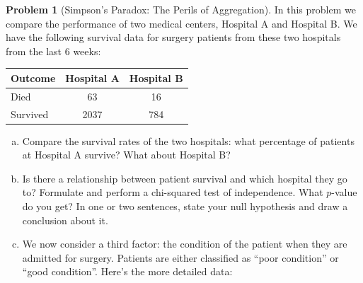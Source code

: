 \documentclass[10pt]{amsart}
\theoremstyle{definition}
\newtheorem{problem}[theorem]{Problem}
\newcommand{\1}[1]{\textbf{1}_{\left[#1\right]}} %
\begin{document}
\newpage
\begin{problem}[Simpson's Paradox: The Perils of Aggregation]

  In this problem we compare the performance of two medical centers, Hospital
  A and Hospital B. We have the following survival data for surgery patients from
  these two hospitals from the last 6 weeks:
  \begin{center}
    \vspace{1em}
    \begin{tabular}{lcc}
      \hline
      \textbf{Outcome} & \textbf{Hospital A} & \textbf{Hospital B} \\
      \hline
      Died     &   63     & 16       \\
      Survived & 2037       & 784       \\
      \hline
    \end{tabular}
    \vspace{2em}
  \end{center}
  \begin{enumerate}[(a)]
    \setlength{\itemsep}{1em}
    \item \label{item:1} Compare the survival rates of the two hospitals: what percentage of
    patients at Hospital A survive? What about Hospital B?
    \item Is there a relationship between patient survival and which hospital
    they go to? Formulate and perform a chi-squared test of independence. What
    $p$-value do you get? In one or two sentences, state your null hypothesis
    and draw a conclusion about it.
    \item We now consider a third factor: the condition of the patient when
    they are admitted for surgery. Patients are either classified as ``poor
    condition'' or ``good condition''. Here's the more detailed data:


\end{enumerate}
\end{problem}
\end{document}
